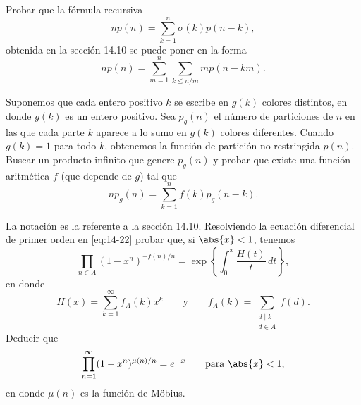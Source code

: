     \begin{ejercicio}
        Probar que la fórmula recursiva
        \begin{equation*}
            np(n)=\sum_{k=1}^{n}\sigma(k)p(n-k),
        \end{equation*}
        obtenida en la sección 14.10 se puede poner en la forma
        \begin{equation*}
            np(n)=\sum_{m=1}^{n}\sum_{k\leq n/m}mp(n-km).
        \end{equation*}
    \end{ejercicio}

    \begin{ejercicio}
        Suponemos que cada entero positivo $k$ se escribe en $g(k)$ colores distintos, en donde
        $g(k)$ es un entero positivo. Sea $p_g(n)$ el número de particiones de $n$ en las que
        cada parte $k$ aparece a lo sumo en $g(k)$ colores diferentes. Cuando $g(k)=1$ para todo
        $k$, obtenemos la función de partición no restringida $p(n)$. Buscar un producto
        infinito que genere $p_g(n)$ y probar que existe una función aritmética $f$ (que depende
        de $g$) tal que
        \begin{equation*}
            np_g(n)=\sum_{k=1}^{n}f(k)p_g(n-k).
        \end{equation*}
    \end{ejercicio}

    \begin{ejercicio}
        La notación es la referente a la sección 14.10. Resolviendo la ecuación diferencial de
        primer orden en \eqref{eq:14-22} probar que, si $\abs{x}<1$, tenemos
        \begin{equation*}
            \prod_{n\in A}(1-x^n)^{-f(n)/n}=\exp\left\{\int_0^x\frac{H(t)}{t}\,dt\right\},
        \end{equation*}
        en donde
        \begin{equation*}
            H(x)=\sum_{k=1}^{\infty}f_A(k)x^k\qquad\text{y}\qquad f_A(k)=\sum_{\substack{d\mid k\\d\in A}}f(d).
        \end{equation*}
        Deducir que
        \begin{equation*}
            \prod_{n=1}^{\infty}(1-x^n)^{\mu(n)/n}=e^{-x}\qquad\text{para }\abs{x}<1,
        \end{equation*}
        en donde $\mu(n)$ es la función de Möbius.
    \end{ejercicio}


